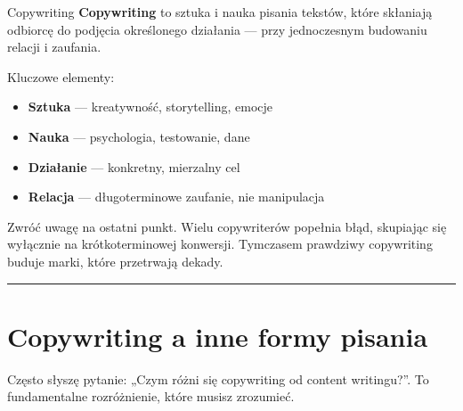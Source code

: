 \documentclass[
  12pt,
  a4paper,
  twoside,
  openright,
  12pt,
  DIV=12,
  BCOR=12mm]{scrbook}
\newcommand{\decoline}{%
  \begin{center}
    \textcolor{bordergray}{\rule{0.3\textwidth}{0.5pt}}
  \end{center}
}
\begin{document}
\begin{pojecie}{Copywriting}
\textbf{Copywriting} to sztuka i nauka pisania tekstów, które skłaniają odbiorcę do podjęcia określonego działania --- przy jednoczesnym budowaniu relacji i zaufania.

\medskip
Kluczowe elementy:
\begin{itemize}
  \item \textbf{Sztuka} --- kreatywność, storytelling, emocje
  \item \textbf{Nauka} --- psychologia, testowanie, dane  
  \item \textbf{Działanie} --- konkretny, mierzalny cel
  \item \textbf{Relacja} --- długoterminowe zaufanie, nie manipulacja
\end{itemize}
\end{pojecie}

Zwróć uwagę na ostatni punkt. Wielu copywriterów popełnia błąd,
skupiając się wyłącznie na krótkoterminowej konwersji. Tymczasem
prawdziwy copywriting buduje marki, które przetrwają dekady.

\decoline

\section{Copywriting a inne formy
pisania}\label{copywriting-a-inne-formy-pisania}

Często słyszę pytanie: „Czym różni się copywriting od content
writingu?''. To fundamentalne rozróżnienie, które musisz zrozumieć.
\end{document}
